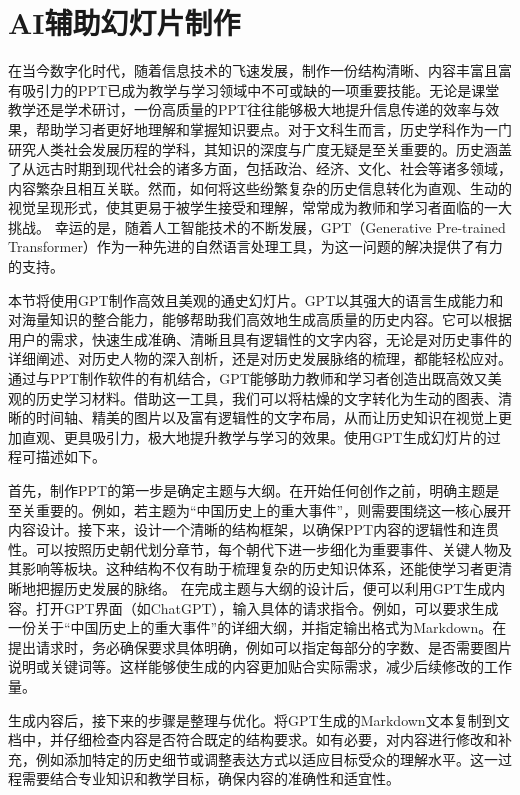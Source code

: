 \section{AI辅助幻灯片制作}

在当今数字化时代，随着信息技术的飞速发展，制作一份结构清晰、内容丰富且富有吸引力的PPT已成为教学与学习领域中不可或缺的一项重要技能。无论是课堂教学还是学术研讨，一份高质量的PPT往往能够极大地提升信息传递的效率与效果，帮助学习者更好地理解和掌握知识要点。对于文科生而言，历史学科作为一门研究人类社会发展历程的学科，其知识的深度与广度无疑是至关重要的。历史涵盖了从远古时期到现代社会的诸多方面，包括政治、经济、文化、社会等诸多领域，内容繁杂且相互关联。然而，如何将这些纷繁复杂的历史信息转化为直观、生动的视觉呈现形式，使其更易于被学生接受和理解，常常成为教师和学习者面临的一大挑战。
幸运的是，随着人工智能技术的不断发展，GPT（Generative Pre-trained Transformer）作为一种先进的自然语言处理工具，为这一问题的解决提供了有力的支持。

本节将使用GPT制作高效且美观的通史幻灯片。GPT以其强大的语言生成能力和对海量知识的整合能力，能够帮助我们高效地生成高质量的历史内容。它可以根据用户的需求，快速生成准确、清晰且具有逻辑性的文字内容，无论是对历史事件的详细阐述、对历史人物的深入剖析，还是对历史发展脉络的梳理，都能轻松应对。通过与PPT制作软件的有机结合，GPT能够助力教师和学习者创造出既高效又美观的历史学习材料。借助这一工具，我们可以将枯燥的文字转化为生动的图表、清晰的时间轴、精美的图片以及富有逻辑性的文字布局，从而让历史知识在视觉上更加直观、更具吸引力，极大地提升教学与学习的效果。使用GPT生成幻灯片的过程可描述如下。

首先，制作PPT的第一步是确定主题与大纲。在开始任何创作之前，明确主题是至关重要的。例如，若主题为“中国历史上的重大事件”，则需要围绕这一核心展开内容设计。接下来，设计一个清晰的结构框架，以确保PPT内容的逻辑性和连贯性。可以按照历史朝代划分章节，每个朝代下进一步细化为重要事件、关键人物及其影响等板块。这种结构不仅有助于梳理复杂的历史知识体系，还能使学习者更清晰地把握历史发展的脉络。
在完成主题与大纲的设计后，便可以利用GPT生成内容。打开GPT界面（如ChatGPT），输入具体的请求指令。例如，可以要求生成一份关于“中国历史上的重大事件”的详细大纲，并指定输出格式为Markdown。在提出请求时，务必确保要求具体明确，例如可以指定每部分的字数、是否需要图片说明或关键词等。这样能够使生成的内容更加贴合实际需求，减少后续修改的工作量。

生成内容后，接下来的步骤是整理与优化。将GPT生成的Markdown文本复制到文档中，并仔细检查内容是否符合既定的结构要求。如有必要，对内容进行修改和补充，例如添加特定的历史细节或调整表达方式以适应目标受众的理解水平。这一过程需要结合专业知识和教学目标，确保内容的准确性和适宜性。

